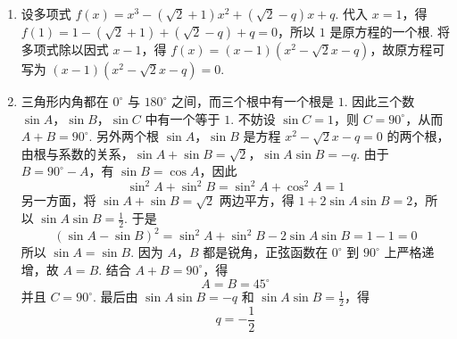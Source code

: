 \begin{solution}
\begin{enumerate}
\item 设多项式 \(f(x)=x^{3}-(\sqrt2+1)x^{2}+(\sqrt2-q)x+q\). 代入 \(x=1\)，得 \(f(1)=1-(\sqrt2+1)+(\sqrt2-q)+q=0\)，所以 \(1\) 是原方程的一个根. 将多项式除以因式 \(x-1\)，得 \(f(x)=(x-1)\left(x^{2}-\sqrt2x-q\right)\)，故原方程可写为 \((x-1)\left(x^{2}-\sqrt2x-q\right)=0\).

\item 三角形内角都在 \(0^{\circ}\) 与 \(180^{\circ}\) 之间，而三个根中有一个根是 \(1\). 因此三个数 \(\sin A\)，\(\sin B\)，\(\sin C\) 中有一个等于 \(1\). 不妨设 \(\sin C=1\)，则 \(C=90^{\circ}\)，从而 \(A+B=90^{\circ}\). 另外两个根 \(\sin A\)，\(\sin B\) 是方程 \(x^{2}-\sqrt2x-q=0\) 的两个根，由根与系数的关系，\(\sin A+\sin B=\sqrt2\)，\(\sin A\sin B=-q\).
由于 \(B=90^{\circ}-A\)，有 \(\sin B=\cos A\)，因此
\[
\sin^{2}A+\sin^{2}B=\sin^{2}A+\cos^{2}A=1
\]
另一方面，将 \(\sin A+\sin B=\sqrt2\) 两边平方，得 \(1+2\sin A\sin B=2\)，所以 \(\sin A\sin B=\frac{1}{2}\).
于是
\[
(\sin A-\sin B)^2=\sin^2A+\sin^2B-2\sin A\sin B=1-1=0
\]
所以 \(\sin A=\sin B\). 因为 \(A\)，\(B\) 都是锐角，正弦函数在 \(0^{\circ}\) 到 \(90^{\circ}\) 上严格递增，故 \(A=B\). 结合 \(A+B=90^{\circ}\)，得
\[
A=B=45^{\circ}
\]
并且 \(C=90^{\circ}\).
最后由 \(\sin A\sin B=-q\) 和 \(\sin A\sin B=\frac12\)，得
\[
q=-\frac12
\]
\end{enumerate}
\end{solution}

